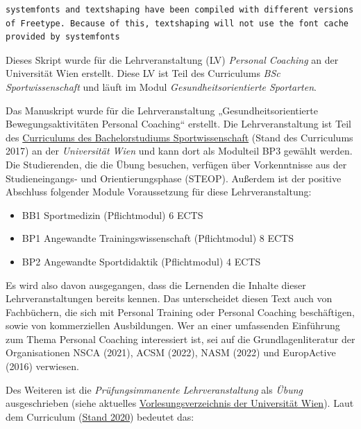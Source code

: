 \documentclass[
  letterpaper,
  DIV=11,
  numbers=noendperiod]{scrreprt}
\providecommand{\tightlist}{%
  \setlength{\itemsep}{0pt}\setlength{\parskip}{0pt}}
\begin{document}
\begin{verbatim}
systemfonts and textshaping have been compiled with different versions of Freetype. Because of this, textshaping will not use the font cache provided by systemfonts
\end{verbatim}

Dieses Skript wurde für die Lehrveranstaltung (LV) \emph{Personal
Coaching} an der Universität Wien erstellt. Diese LV ist Teil des
Curriculums \emph{BSc Sportwissenschaft} und läuft im Modul
\emph{Gesundheitsorientierte Sportarten}.

Das Manuskript wurde für die Lehrveranstaltung „Gesundheitsorientierte
Bewegungsaktivitäten Personal Coaching`` erstellt. Die Lehrveranstaltung
ist Teil des
\href{https://ufind.univie.ac.at/de/vvz_sub.html?semester=2024S&path=308018}{Curriculums
des Bachelorstudiums Sportwissenschaft} (Stand des Curriculums 2017) an
der \emph{Universität Wien} und kann dort als Modulteil BP3 gewählt
werden. Die Studierenden, die die Übung besuchen, verfügen über
Vorkenntnisse aus der Studieneingangs- und Orientierungsphase (STEOP).
Außerdem ist der positive Abschluss folgender Module Voraussetzung für
diese Lehrveranstaltung:

\begin{itemize}
\tightlist
\item
  BB1 Sportmedizin (Pflichtmodul) 6 ECTS
\item
  BP1 Angewandte Trainingswissenschaft (Pflichtmodul) 8 ECTS
\item
  BP2 Angewandte Sportdidaktik (Pflichtmodul) 4 ECTS
\end{itemize}

Es wird also davon ausgegangen, dass die Lernenden die Inhalte dieser
Lehrveranstaltungen bereits kennen. Das unterscheidet diesen Text auch
von Fachbüchern, die sich mit Personal Training oder Personal Coaching
beschäftigen, sowie von kommerziellen Ausbildungen. Wer an einer
umfassenden Einführung zum Thema Personal Coaching interessiert ist, sei
auf die Grundlagenliteratur der Organisationen NSCA (2021), ACSM (2022),
NASM (2022) und EuropActive (2016) verwiesen.

Des Weiteren ist die \emph{Prüfungsimmanente} \emph{Lehrveranstaltung}
als \emph{Übung} ausgeschrieben (siehe aktuelles
\href{https://ufind.univie.ac.at/de/index.html}{Vorlesungsverzeichnis
der Universität Wien}). Laut dem Curriculum
(\href{https://senat.univie.ac.at/fileadmin/user_upload/s_senat/konsolidierte_Bachelorcurricula/BA_Sportwissenschaft.pdf}{Stand
2020}) bedeutet das:
\end{document}
